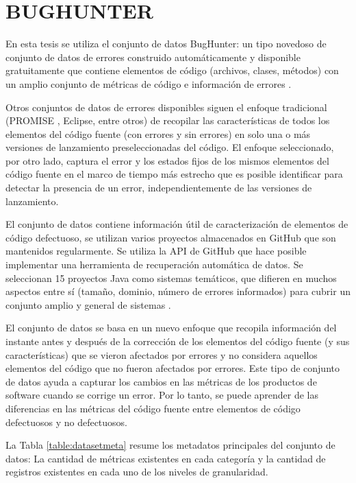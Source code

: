 \section{BUGHUNTER}


En esta tesis se utiliza el conjunto de datos BugHunter: un tipo novedoso de conjunto de datos de errores construido automáticamente y disponible gratuitamente que contiene elementos de código (archivos, clases, métodos) con un amplio conjunto de métricas de código e información de errores \cite{ferenc_automatically_2020}.

Otros conjuntos de datos de errores disponibles siguen el enfoque tradicional (PROMISE \cite{Sayyad-Shirabad+Menzies:2005}, Eclipse, entre otros) de recopilar las características de todos los elementos del código fuente (con errores y sin errores) en solo una o más versiones de lanzamiento preseleccionadas del código. El enfoque seleccionado, por otro lado, captura el error y los estados fijos de los mismos elementos del código fuente en el marco de tiempo más estrecho que es posible identificar para detectar la presencia de un error, independientemente de las versiones de lanzamiento.

El conjunto de datos contiene información útil de caracterización de elementos de código defectuoso, se utilizan varios proyectos almacenados en GitHub que son mantenidos regularmente. Se utiliza la API de GitHub que hace posible implementar una herramienta de recuperación automática de datos. Se seleccionan 15 proyectos Java como sistemas temáticos, que difieren en muchos aspectos entre sí (tamaño, dominio, número de errores informados) para cubrir un conjunto amplio y general de sistemas \cite{ferenc_automatically_2020}. 

El conjunto de datos se basa en un nuevo enfoque que recopila información del instante antes y después de la corrección de los elementos del código fuente (y sus características) que se vieron afectados por errores y no considera aquellos elementos del código que no fueron afectados por errores. Este tipo de conjunto de datos ayuda a capturar los cambios en las métricas de los productos de software cuando se corrige un error. Por lo tanto, se puede aprender de las diferencias en las métricas del código fuente entre elementos de código defectuosos y no defectuosos.

La Tabla \ref{table:datasetmeta} resume los metadatos principales del conjunto de datos: La cantidad de métricas existentes en cada categoría y la cantidad de registros existentes en cada uno de los niveles de granularidad.


